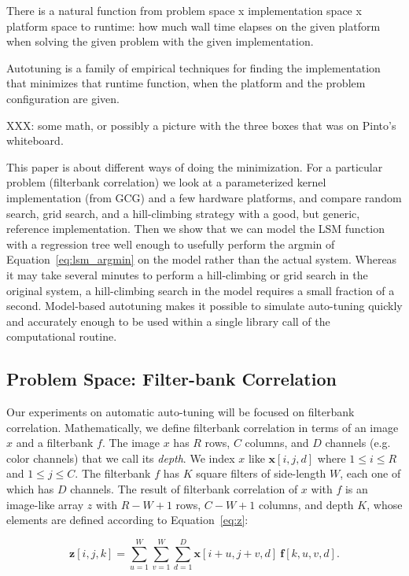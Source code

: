 \documentclass{sig-alternate}
\begin{document}
There is a natural function from
problem space x implementation space x platform space to runtime:
how much wall time elapses on the given platform when solving the given
problem with the given implementation.

Autotuning is a family of empirical techniques for finding the implementation
that minimizes that runtime function, when the platform and the problem
configuration are given.

XXX: some math, or possibly a picture with the three boxes that was on Pinto's
whiteboard.

This paper is about different ways of doing the minimization.
For a particular problem (filterbank correlation) we
look at a parameterized kernel implementation (from GCG)
and a few hardware platforms, and compare
random search, grid search, and a hill-climbing strategy with a good, but
generic, reference implementation.
Then we show that we can model the LSM function with a regression tree
well enough to usefully perform the argmin of Equation~\ref{eq:lsm_argmin}
on the model rather than the actual system. Whereas it may take several
minutes to perform a hill-climbing or grid search in the original system,
a hill-climbing search in the model requires a small fraction of a second.
Model-based autotuning makes it possible to simulate auto-tuning quickly and
accurately enough to be used within a single library call of the computational
routine.



\subsection{Problem Space: Filter-bank Correlation}

Our experiments on automatic auto-tuning will be focused on filterbank
correlation.  Mathematically, we define filterbank correlation in terms of an
image $x$ and a filterbank $f$.
The image $x$ has $R$ rows, $C$ columns, and $D$ channels (e.g. color
channels) that we call its {\em depth}. We index $x$ like $\mathbf{x}[i,j,d]$
where $1 \leq i \leq R$ and $1 \leq j \leq C$.
The filterbank $f$ has $K$ square filters of side-length $W$, each one of
which has $D$ channels.
The result of filterbank correlation of $x$ with $f$ is an image-like array
$z$ with $R-W+1$ rows, $C-W+1$ columns, and depth $K$, whose elements are
defined according to Equation~\ref{eq:z}:

\begin{equation}
    \mathbf{z}[i,j,k] = \sum_{u=1}^{W} \sum_{v=1}^{W} \sum_{d=1}^D
        \mathbf{x}[i+u, j+v, d]~ \mathbf{f}[k, u, v, d].
        \label{eq:z}
\end{equation}
\end{document}
